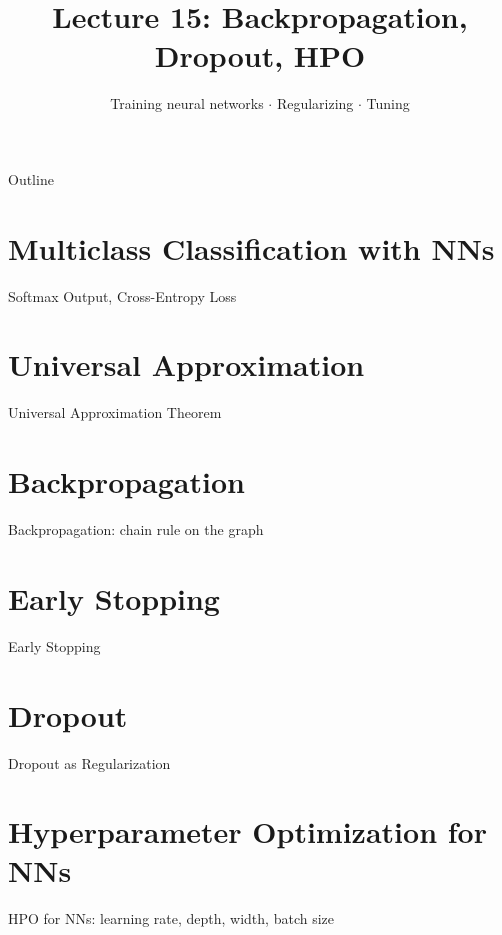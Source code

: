 \documentclass[aspectratio=169]{beamer}
\title{Lecture 15: Backpropagation, Dropout, HPO}
\subtitle{Training neural networks $\cdot$ Regularizing $\cdot$ Tuning}
\date{}
\begin{document}
\begin{frame}\titlepage\end{frame}

\begin{frame}{Outline}
  \tableofcontents
\end{frame}

\section{Multiclass Classification with NNs}
\begin{frame}{Softmax Output, Cross-Entropy Loss}
\end{frame}

\section{Universal Approximation}
\begin{frame}{Universal Approximation Theorem}
\end{frame}

\section{Backpropagation}
\begin{frame}{Backpropagation: chain rule on the graph}
\end{frame}

\section{Early Stopping}
\begin{frame}{Early Stopping}
\end{frame}

\section{Dropout}
\begin{frame}{Dropout as Regularization}
\end{frame}

\section{Hyperparameter Optimization for NNs}
\begin{frame}{HPO for NNs: learning rate, depth, width, batch size}
\end{frame}
\end{document}

